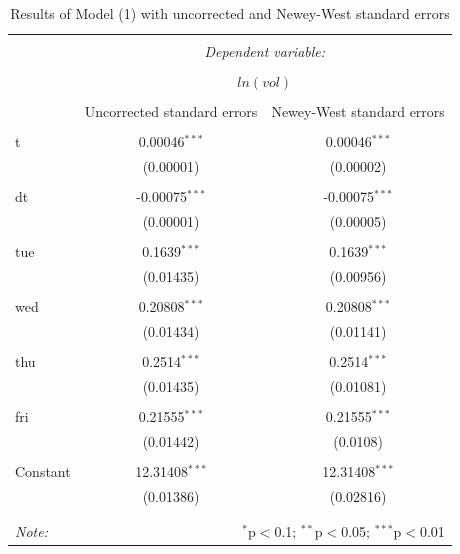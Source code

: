 \documentclass{article}\usepackage[]{graphicx}\usepackage[]{color}
\begin{document}
  \begin{table}[h!] \centering 
      \caption{Results of Model (1) with uncorrected and Newey-West standard errors} 
      \label{tab2} 
      \begin{tabular}{@{\extracolsep{5pt}}lcc} 
          \\[-1.8ex]\hline 
          \hline \\[-1.8ex] 
           & \multicolumn{2}{c}{\textit{Dependent variable:}} \\ 
          \cline{2-3} 
          \\[-1.8ex] & \multicolumn{2}{c}{$ln(vol)$} \\ 
          \\[-1.8ex] & Uncorrected standard errors & Newey-West standard errors \\ 
          \hline \\[-1.8ex] 
           t & 0.00046$^{***}$ & 0.00046$^{***}$ \\ 
            & (0.00001) & (0.00002) \\ 
            & & \\ 
           dt & -0.00075$^{***}$ & -0.00075$^{***}$ \\ 
            & (0.00001) & (0.00005) \\ 
            & & \\ 
           tue & 0.1639$^{***}$ & 0.1639$^{***}$ \\ 
            & (0.01435) & (0.00956) \\ 
            & & \\ 
           wed & 0.20808$^{***}$ & 0.20808$^{***}$ \\ 
            & (0.01434) & (0.01141) \\ 
            & & \\ 
           thu & 0.2514$^{***}$ & 0.2514$^{***}$ \\ 
            & (0.01435) & (0.01081) \\ 
            & & \\ 
           fri & 0.21555$^{***}$ & 0.21555$^{***}$ \\ 
            & (0.01442) & (0.0108) \\ 
            & & \\ 
           Constant & 12.31408$^{***}$ & 12.31408$^{***}$ \\ 
            & (0.01386) & (0.02816) \\ 
            & & \\ 
          \hline \\[-1.8ex] 
          \textit{Note:}  & \multicolumn{2}{r}{$^{*}$p$<$0.1; $^{**}$p$<$0.05; $^{***}$p$<$0.01} \\ 
    \end{tabular} 
  \end{table} 
\end{document}
